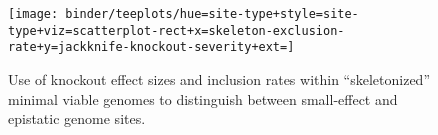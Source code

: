 \begin{figure}
  \centering
  \footnotesize
  \texttt{[image: binder/teeplots/hue=site-type+style=site-type+viz=scatterplot-rect+x=skeleton-exclusion-rate+y=jackknife-knockout-severity+ext=]}
  \vspace{-0.25in}
  \caption{%
    Use of knockout effect sizes and inclusion rates within ``skeletonized'' minimal viable genomes to distinguish between small-effect and epistatic genome sites.
  }
  \label{fig:epistatic}
  \vspace{-0.25in}
\end{figure}
